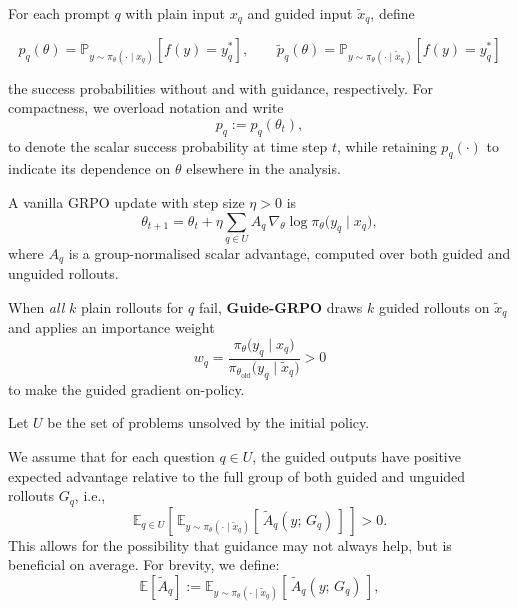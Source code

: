 \documentclass{article}
\begin{document}
{For each prompt $q$ with plain input $x_q$ and guided input $\tilde x_q$, define  

\begin{equation}
\label{eq:pq_defs}
p_q(\theta) = \mathbb{P}_{y \sim \pi_\theta(\cdot \mid x_q)} \left[f(y) = y_q^* \right], \qquad
\tilde p_q(\theta) = \mathbb{P}_{y \sim \pi_\theta(\cdot \mid \tilde x_q)} \left[f(y) = y_q^* \right]
\end{equation}


the success probabilities without and with guidance, respectively. For compactness, we overload notation and write
\begin{equation}
p_q := p_q(\theta_t),
\end{equation}
to denote the scalar success probability at time step \(t\), while retaining \(p_q(\cdot)\) to indicate its dependence on \(\theta\) elsewhere in the analysis.

A vanilla GRPO update with step size $\eta>0$ is
\begin{equation}
\label{eq:vanilla_grpo}
\theta_{t+1} = \theta_t + \eta \sum_{q\in U} A_q\, \nabla_\theta \log \pi_\theta\bigl(y_q \mid x_q\bigr),
\end{equation}
where $A_q$ is a group-normalised scalar advantage, computed over both guided and unguided rollouts.  

When \emph{all} $k$ plain rollouts for $q$ fail, \textbf{Guide-GRPO} draws
$k$ guided rollouts on $\tilde x_q$ and applies an importance weight  
\begin{equation}
\label{eq:importance_weight}
w_q = \frac{\pi_\theta\bigl(y_q \mid x_q\bigr)}{\pi_{\theta_{\text{old}}}\bigl(y_q \mid \tilde x_q\bigr)} > 0
\end{equation}
to make the guided gradient on-policy.


Let $U$ be the set of problems unsolved by the initial policy.  

We assume that for each question $q \in U$, the guided outputs have positive expected advantage 
relative to the full group of both guided and unguided rollouts \( G_q \), i.e.,
\begin{equation}
\mathbb{E}_{q \in U} \left[\, \mathbb{E}_{y \sim \pi_\theta(\cdot \mid \tilde{x}_q)} \left[\, \tilde{A}_q(y;\, G_q) \,\right] \,\right] > 0.
\end{equation}
This allows for the possibility that guidance may not always help, but is beneficial on average. For brevity, we define:
\begin{equation}
\mathbb{E}[\tilde A_q] := \mathbb{E}_{y \sim \pi_\theta(\cdot \mid \tilde{x}_q)} \left[\, \tilde{A}_q(y;\, G_q) \,\right],
\end{equation}

}
\end{document}
